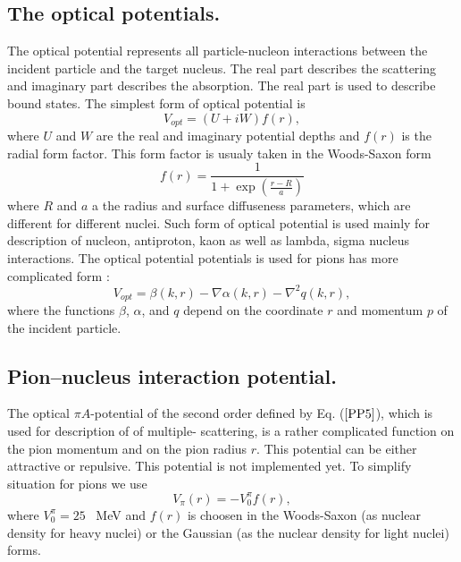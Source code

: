 \subsection{The optical potentials.}
\hspace{1.0em}
The optical potential represents all particle-nucleon interactions between 
 the incident particle and the target nucleus. The real part describes the 
 scattering and imaginary part describes the absorption. The real part is 
 used to describe bound states. 
 The simplest form of optical potential is 
\begin{equation}
\label{PP3} V_{opt}=(U + iW)f(r),
\end{equation}
where $U$ and $W$ are the real and imaginary potential depths and $f(r)$ is the
radial form factor. This form factor is usualy taken in the Woods-Saxon form
\begin{equation}
\label{PP4}f(r)=\frac{1}{1+\exp{(\frac{r-R}{a})}}
\end{equation}
where $R$ and $a$ a the radius and surface diffuseness parameters, which 
are different for different nuclei.
Such form of optical potential is used mainly for description of nucleon, 
antiproton, kaon as well as lambda, sigma nucleus interactions.
The optical potential potentials is used for pions has more
 complicated form \cite{SMC79}:
\begin{equation}
\label{PP5} V_{opt} = \beta(k,r)-\nabla \alpha(k,r) - \nabla^2 q(k,r),
\end{equation}
where the functions $\beta$, $\alpha$, and $q$ depend on the coordinate $r$ 
and momentum $p$ of the incident particle.

\subsection{Pion--nucleus interaction potential.}
\hspace{1.0em}
The optical $\pi A$-potential 
of the second order \cite{SMC79} defined by Eq. ($\ref{PP5}$), 
which is used for description of of multiple-
scattering, is  
a rather complicated function 
on the pion momentum and on the pion radius $r$. 
This potential can be either attractive or repulsive. This potential is not 
implemented yet. To simplify situation 
for pions we use  
\begin{equation}
\label{PP6} V_{\pi}(r)=-V^{\pi}_{0}f(r),
\end{equation}
where $V^{\pi}_{0} = 25$ \ MeV and $f(r)$ is choosen in the Woods-Saxon 
(as nuclear density for heavy nuclei) or the Gaussian (as the nuclear 
density for light nuclei) forms.

